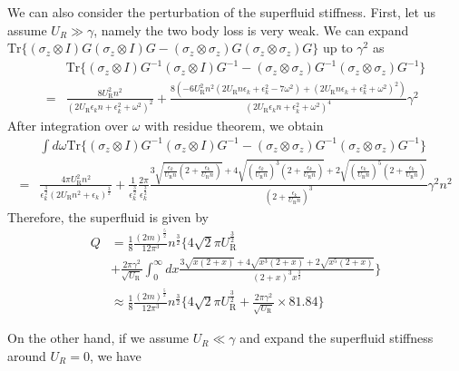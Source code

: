 \documentclass{article}
\begin{document}
We can also consider the perturbation of the superfluid stiffness. First, let us assume $U_R\gg\gamma$, namely the two body loss is very weak. We can expand $\mathrm{Tr}\{(\sigma_{z}\otimes I)G(\sigma_{z}\otimes I)G-(\sigma_{z}\otimes\sigma_{z})G(\sigma_{z}\otimes\sigma_{z})G\}$
up to $\gamma^{2}$ as
\begin{align}
 & \mathrm{Tr}\{(\sigma_{z}\otimes I)G^{-1}(\sigma_{z}\otimes I)G^{-1}-(\sigma_{z}\otimes\sigma_{z})G^{-1}(\sigma_{z}\otimes\sigma_{z})G^{-1}\}\nonumber \\
= & \frac{8U_{\mathrm{R}}^{2}n^{2}}{(2U_{\mathrm{R}}\epsilon_{k}n+\epsilon_{k}^{2}+\omega^{2})^{2}}+\frac{8(-6U_{\mathrm{R}}^{2}n^{2}(2U_{\mathrm{R}}n\epsilon_{k}+\epsilon_{k}^{2}-7\omega^{2})+(2U_{\mathrm{R}}n\epsilon_{k}+\epsilon_{k}^{2}+\omega^{2})^{2})}{(2U_{\mathrm{R}}\epsilon_{k}n+\epsilon_{k}^{2}+\omega^{2})^{4}}\gamma^{2}
\end{align}
After integration over $\omega$ with residue theorem, we obtain
\begin{align}
 & \int d\omega\mathrm{Tr}\{(\sigma_{z}\otimes I)G^{-1}(\sigma_{z}\otimes I)G^{-1}-(\sigma_{z}\otimes\sigma_{z})G^{-1}(\sigma_{z}\otimes\sigma_{z})G^{-1}\}\nonumber \\
= & \frac{4\pi U_{\mathrm{R}}^{2}n^{2}}{\epsilon_{k}^{\frac{3}{2}}(2U_{\mathrm{R}}n^{2}+\epsilon_{k})^{\frac{3}{2}}}+\frac{1}{\epsilon_{k}^{\frac{3}{2}}}\frac{2\pi}{\epsilon_{k}^{\frac{3}{2}}}\frac{3\sqrt{\frac{\epsilon_{k}}{U_{\mathrm{R}}n}(2+\frac{\epsilon_{k}}{U_{\mathrm{R}}n})}+4\sqrt{(\frac{\epsilon_{k}}{U_{\mathrm{R}}n})^{3}(2+\frac{\epsilon_{k}}{U_{\mathrm{R}}n})}+2\sqrt{(\frac{\epsilon_{k}}{U_{\mathrm{R}}n})^{5}(2+\frac{\epsilon_{k}}{U_{\mathrm{R}}n})}}{(2+\frac{\epsilon_{k}}{U_{\mathrm{R}}n})^{3}}\gamma^{2}n^{2}
\end{align}
Therefore, the superfluid is given by
\begin{align}
Q & =\frac{1}{8}\frac{(2m)^{\frac{5}{2}}}{12\pi^{3}}n^{\frac{3}{2}}\{4\sqrt{2}\pi U_{\mathrm{R}}^{\frac{3}{2}}\nonumber \\
 & +\frac{2\pi\gamma^{2}}{\sqrt{U_{\mathrm{R}}}}\int_{0}^{\infty}dx\frac{3\sqrt{x(2+x)}+4\sqrt{x^{3}(2+x)}+2\sqrt{x^{5}(2+x)}}{(2+x)^{3}x^{\frac{3}{2}}}\}\\
 & \approx\frac{1}{8}\frac{(2m)^{\frac{5}{2}}}{12\pi^{3}}n^{\frac{3}{2}}\{4\sqrt{2}\pi U_{\mathrm{R}}^{\frac{3}{2}}+\frac{2\pi\gamma^{2}}{\sqrt{U_{\mathrm{R}}}}\times81.84\}
\end{align}

On the other hand, if we assume $U_{R}\ll\gamma$ and expand the superfluid
stiffness around $U_{R}=0$, we have
\end{document}
